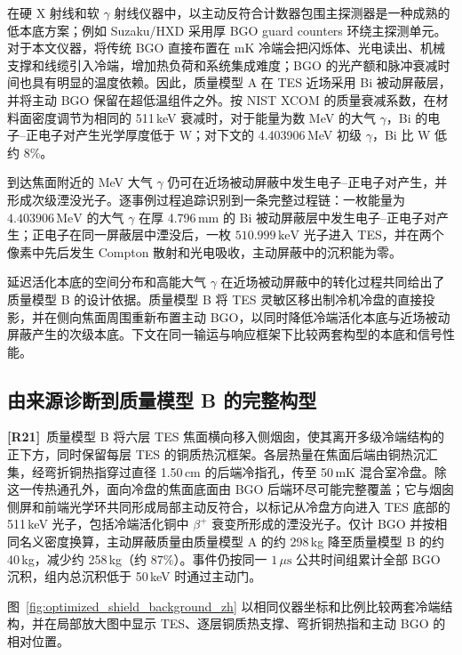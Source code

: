 \documentclass[11pt]{article}
\newcommand{\revmark}[1]{\textcolor{revisionblue}{\textbf{[R#1]}}\ }
\newcommand{\revblue}[1]{\textcolor{revisionblue}{#1}}
\newcommand{\keV}{\,\mathrm{keV}}
\newcommand{\MeV}{\,\mathrm{MeV}}
\begin{document}
在硬 X 射线和软 $\gamma$ 射线仪器中，以主动反符合计数器包围主探测器是一种成熟的低本底方案；例如 Suzaku/HXD 采用厚 BGO guard counters 环绕主探测单元\cite{Takahashi2007HXD}。对于本文仪器，将传统 BGO 直接布置在 mK 冷端会把闪烁体、光电读出、机械支撑和线缆引入冷端，增加热负荷和系统集成难度；BGO 的光产额和脉冲衰减时间也具有明显的温度依赖\cite{Verdier2011BGO}。因此，质量模型 A 在 TES 近场采用 Bi 被动屏蔽层，并将主动 BGO 保留在超低温组件之外。按 NIST XCOM 的质量衰减系数，在材料面密度调节为相同的 511\,keV 衰减时，对于能量为数 MeV 的大气 $\gamma$，Bi 的电子--正电子对产生光学厚度低于 W；对下文的 4.403906\,MeV 初级 $\gamma$，Bi 比 W 低约 $8\%$\cite{NISTXCOM}。

到达焦面附近的 MeV 大气 $\gamma$ 仍可在近场被动屏蔽中发生电子--正电子对产生，并形成次级湮没光子。逐事例过程追踪识别到一条完整过程链：一枚能量为 $4.403906\MeV$ 的大气 $\gamma$ 在厚 4.796\,mm 的 Bi 被动屏蔽层中发生电子--正电子对产生；正电子在同一屏蔽层中湮没后，一枚 $510.999\keV$ 光子进入 TES，并在两个像素中先后发生 Compton 散射和光电吸收，主动屏蔽中的沉积能为零。

延迟活化本底的空间分布和高能大气 $\gamma$ 在近场被动屏蔽中的转化过程共同给出了质量模型 B 的设计依据。质量模型 B 将 TES 灵敏区移出制冷机冷盘的直接投影，并在侧向焦面周围重新布置主动 BGO，以同时降低冷端活化本底与近场被动屏蔽产生的次级本底。下文在同一输运与响应框架下比较两套构型的本底和信号性能。
\endgroup

\FloatBarrier

\subsection{由来源诊断到质量模型 B 的完整构型}
\label{subsec:optimized_shield_results_zh}

\revmark{21}\revblue{质量模型 B 将六层 TES 焦面横向移入侧烟囱，使其离开多级冷端结构的正下方，同时保留每层 TES 的铜质热沉框架。各层热量在焦面后端由铜热沉汇集，经弯折铜热指穿过直径 1.50\,cm 的后端冷指孔，传至 50\,mK 混合室冷盘。除这一传热通孔外，面向冷盘的焦面底面由 BGO 后端环尽可能完整覆盖；它与烟囱侧屏和前端光学环共同形成局部主动反符合，以标记从冷盘方向进入 TES 底部的 511\,keV 光子，包括冷端活化铜中 $\beta^+$ 衰变所形成的湮没光子。仅计 BGO 并按相同名义密度换算，主动屏蔽质量由质量模型 A 的约 298\,kg 降至质量模型 B 的约 40\,kg，减少约 258\,kg（约 $87\%$）。事件仍按同一 $1\,\mu\mathrm{s}$ 公共时间组累计全部 BGO 沉积，组内总沉积低于 50\,keV 时通过主动门。}

\revblue{图~\ref{fig:optimized_shield_background_zh} 以相同仪器坐标和比例比较两套冷端结构，并在局部放大图中显示 TES、逐层铜质热支撑、弯折铜热指和主动 BGO 的相对位置。}
\end{document}
